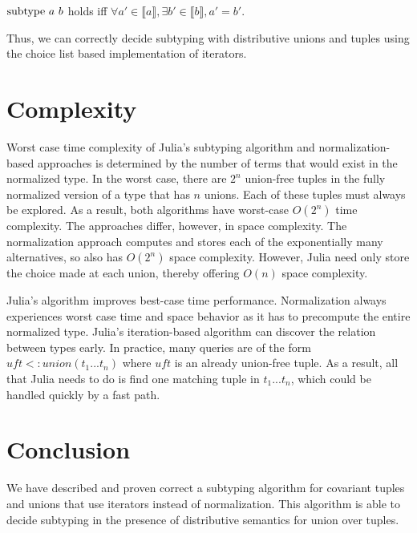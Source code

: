 \documentclass[a4paper,english]{lipics-v2019}
\newcommand{\denotes}[1]{\llbracket #1 \rrbracket}
\renewcommand{\c}[1]{\ensuremath{\text{\lstinline{#1}}}\xspace}
\begin{document}
\begin{theorem}
$\c{subtype}~a~b$ holds iff $\forall a'\in\denotes{a}, \exists
  b'\in\denotes{b}, a'=b'$.
\end{theorem}

\noindent
Thus, we can correctly decide subtyping with distributive unions and tuples
using the choice list based implementation of iterators.

\section{Complexity}

Worst case time complexity of Julia's subtyping algorithm and
normalization-based approaches is determined by the number of terms that
would exist in the normalized type. In the worst case, there are $2^n$
union-free tuples in the fully normalized version of a type that has $n$
unions.  Each of these tuples must always be explored. As a result, both
algorithms have worst-case $O(2^n)$ time complexity. The approaches differ,
however, in space complexity. The normalization approach computes and stores
each of the exponentially many alternatives, so also has $O(2^n)$ space
complexity. However, Julia need only store the choice made at each union,
thereby offering $O(n)$ space complexity.

Julia's algorithm improves best-case time performance.  Normalization always
experiences worst case time and space behavior as it has to precompute the
entire normalized type. Julia's iteration-based algorithm can discover the
relation between types early. In practice, many queries are of the form
$\mathit{uft} <: union(t_1...t_n)$ where $\mathit{uft}$ is an already
union-free tuple. As a result, all that Julia needs to do is find one matching
tuple in $t_1 ... t_n$, which could be handled quickly by a fast path.

\section{Conclusion}

We have described and proven correct a subtyping algorithm for covariant
tuples and unions that use iterators instead of normalization.  This
algorithm is able to decide subtyping in the presence of distributive
semantics for union over tuples.
\end{document}
